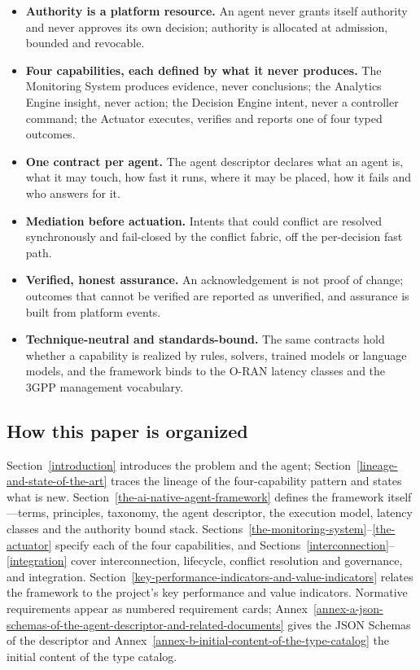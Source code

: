 \begin{keybox}[title={Key points}]
\begin{itemize}
  \item \textbf{Authority is a platform resource.} An agent never grants itself authority and never
        approves its own decision; authority is allocated at admission, bounded and revocable.
  \item \textbf{Four capabilities, each defined by what it never produces.} The Monitoring System
        produces evidence, never conclusions; the Analytics Engine insight, never action; the Decision
        Engine intent, never a controller command; the Actuator executes, verifies and reports one of
        four typed outcomes.
  \item \textbf{One contract per agent.} The agent descriptor declares what an agent is, what it may
        touch, how fast it runs, where it may be placed, how it fails and who answers for it.
  \item \textbf{Mediation before actuation.} Intents that could conflict are resolved synchronously and
        fail-closed by the conflict fabric, off the per-decision fast path.
  \item \textbf{Verified, honest assurance.} An acknowledgement is not proof of change; outcomes that
        cannot be verified are reported as unverified, and assurance is built from platform events.
  \item \textbf{Technique-neutral and standards-bound.} The same contracts hold whether a capability is
        realized by rules, solvers, trained models or language models, and the framework binds to the
        O-RAN latency classes and the 3GPP management vocabulary.
\end{itemize}
\end{keybox}

\subsection*{How this paper is organized}
Section~\ref{introduction} introduces the problem and the agent; Section~\ref{lineage-and-state-of-the-art}
traces the lineage of the four-capability pattern and states what is new. Section~\ref{the-ai-native-agent-framework}
defines the framework itself---terms, principles, taxonomy, the agent descriptor, the execution model,
latency classes and the authority bound stack. Sections~\ref{the-monitoring-system}--\ref{the-actuator}
specify each of the four capabilities, and Sections~\ref{interconnection}--\ref{integration} cover
interconnection, lifecycle, conflict resolution and governance, and integration.
Section~\ref{key-performance-indicators-and-value-indicators} relates the framework to the project's
key performance and value indicators. Normative requirements appear as numbered requirement cards;
Annex~\ref{annex-a-json-schemas-of-the-agent-descriptor-and-related-documents} gives the JSON Schemas
of the descriptor and Annex~\ref{annex-b-initial-content-of-the-type-catalog} the initial content of the
type catalog.
